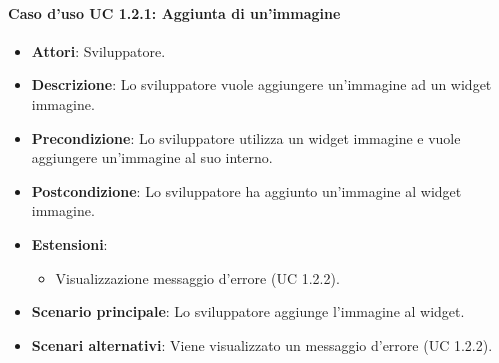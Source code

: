 \paragraph{Caso d'uso UC 1.2.1: Aggiunta di un'immagine}

\FloatBarrier
\begin{itemize}
\item\textbf{Attori}: Sviluppatore.
\item\textbf{Descrizione}: Lo sviluppatore vuole aggiungere un'immagine ad un widget immagine.
\item\textbf{Precondizione}: Lo sviluppatore utilizza un widget immagine e vuole aggiungere un'immagine al suo interno.
\item\textbf{Postcondizione}: Lo sviluppatore ha aggiunto un'immagine al widget immagine.
\item\textbf{Estensioni}: 
\begin{itemize}
\item Visualizzazione messaggio d'errore (UC 1.2.2).
\end{itemize}
\item\textbf{Scenario principale}: Lo sviluppatore aggiunge l'immagine al widget.
\item\textbf{Scenari alternativi}: Viene visualizzato un messaggio d'errore (UC 1.2.2).
\end{itemize}

